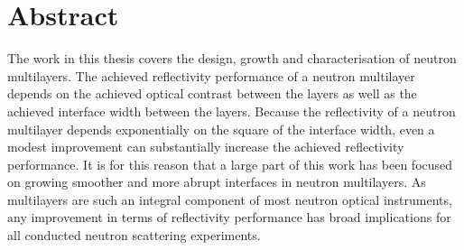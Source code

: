 \chapter{Abstract}
The work in this thesis covers the design, growth and characterisation of neutron multilayers. The achieved reflectivity performance of a neutron multilayer depends on the achieved optical contrast between the layers as well as the achieved interface width between the layers. Because the reflectivity of a neutron multilayer depends exponentially on the square of the interface width, even a modest improvement can substantially increase the achieved reflectivity performance. It is for this reason that a large part of this work has been focused on growing smoother and more abrupt interfaces in neutron multilayers. As multilayers are such an integral component of most neutron optical instruments, any improvement in terms of reflectivity performance has broad implications for all conducted neutron scattering experiments. \\
\\
